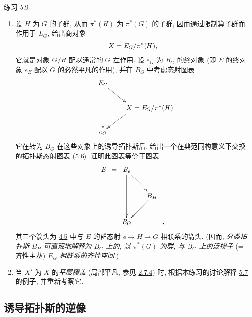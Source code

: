 \begin{enonce*}[remark]{练习 5.9}
\begin{enumerate}
\item 设 $H$ 为 $G$ 的子群, 从而 $\pi^{\ast}(H)$ 为 $\pi^{\ast}(G)$ 的子群, 因而通过限制算子群而作用于 $E_G$, 给出商对象
$$
X=E_G/\pi^{\ast}(H){},
$$
它就是对象 $G/H$ 配以通常的 $G$ 左作用. 设 $e_G$ 为 $B_G$ 的终对象 (即 $E$ 的终对象 $e_E$ 配以 $G$ 的必然平凡的作用), 并在 $B_G$ 中考虑态射图表
\[
\xymatrix@C=-1cm@R=.75cm{
E_G \ar[dd] \ar[rd]& \\
    & \qquad\qquad\quad X = E_{G}/\pi^{*}(H)\ar[ld]\\
e_G & }
\]
它在\pageoriginale 转为 $B_G$ 在这些对象上的诱导拓扑斯后, 给出一个在典范同构意义下交换的拓扑斯态射图表 (\hyperref[IV.subsec5.6]{5.6}). 证明此图表等价于图表
\[
\xymatrix@C=.05cm@R=.85cm{
E & = & B_e \ar[dd] \ar[rrrd]& & &\\
  &   &                    &  & &B_H \ar[llld]\\
  &   & B_G                &  & & &,
}
\]
其三个箭头为 \hyperref[IV.subsec4.5]{4.5} 中与 $E$ 的群态射 $e\rightarrow H\rightarrow G$ 相联系的箭头. (因而, \emph{分类拓扑斯 $B_H$ 可直观地解释为 $B_G$ 上的, 以 $\pi^{\ast}(G)$ 为群, 与 $B_G$ 上的泛挠子} (= 齐性主丛) \emph{$E_G$ 相联系的齐性空间}.)

\item 当 $X'$ 为 $X$ 的\emph{平展覆盖} (局部平凡, 参见 \hyperref[IV.subsubsec2.7.4]{2.7.4}) 时, 根据本练习的讨论解释 \hyperref[IV.subsec5.7]{5.7} 的例子, 并重新考察它.
\end{enumerate}
\end{enonce*}

\setcounter{subsection}{9}
\subsection{诱导拓扑斯的逆像}

